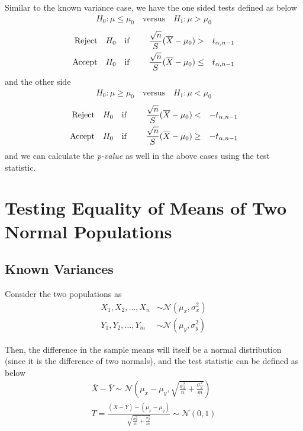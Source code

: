 \documentclass[../probability-notes.tex]{subfiles}
\begin{document}
    Similar to the known variance case, we have the one sided tests defined as below
    \begin{align*}
        H_{0}: \mu \leq \mu_{0} \quad \text{versus} \quad H_{1}: \mu > \mu_{0}
    \end{align*}
    \begin{alignat*}{4}
        \text{Reject\quad} &H_{0} \text{\quad if \quad} &\frac{\sqrt{n}}{S}(\overline{X} - \mu_{0}) &> &t_{\alpha, n-1}\\
        \text{Accept\quad} &H_{0} \text{\quad if\quad} &\frac{\sqrt{n}}{S}(\overline{X} - \mu_{0}) &\leq &t_{\alpha, n-1}\\
    \end{alignat*}
    and the other side
    \begin{align*}
        H_{0}: \mu \geq \mu_{0} \quad \text{versus} \quad H_{1}: \mu < \mu_{0}
    \end{align*}
    \begin{alignat*}{4}
        \text{Reject\quad} &H_{0} \text{\quad if \quad} &\frac{\sqrt{n}}{S}(\overline{X} - \mu_{0}) &< &-t_{\alpha, n-1}\\
        \text{Accept\quad} &H_{0} \text{\quad if\quad} &\frac{\sqrt{n}}{S}(\overline{X} - \mu_{0}) &\geq &-t_{\alpha, n-1}\\
    \end{alignat*}
    and we can calculate the \emph{p-value} as well in the above cases using the test statistic.\newline


    \section{Testing Equality of Means of Two Normal Populations}
    \subsection{Known Variances} \label{mean_diff_normal_known_variance}
    Consider the two populations as
    \begin{align*}
        X_{1}, X_{2}, \ldots, X_{n} &\sim \mathcal{N}(\mu_{x}, \sigma_{x}^{2})\\
        Y_{1}, Y_{2}, \ldots, Y_{m} &\sim \mathcal{N}(\mu_{y}, \sigma_{y}^{2})
    \end{align*}

    Then, the difference in the sample means will itself be a normal distribution (since it is the difference of two normals), and the test statistic can be defined as below
    \begin{align*}
        \overline{X} - \overline{Y} \sim \mathcal{N}(\mu_{x} - \mu_{y}, \sqrt{\frac{\sigma_{x}^{2}}{n} + \frac{\sigma_{y}^{2}}{m}})\\
        T = \frac{(\overline{X} - \overline{Y}) - (\mu_{x} - \mu_{y})}{\sqrt{\frac{\sigma_{x}^{2}}{n} + \frac{\sigma_{y}^{2}}{m}}} \sim \mathcal{N}(0, 1)
    \end{align*}
\end{document}
